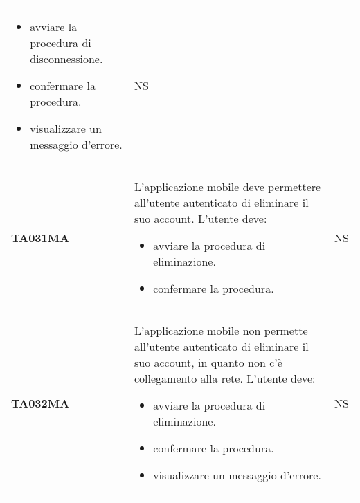 \documentclass[../../piano-di-qualifica.tex]{subfiles}
\begin{document}
\begin{longtable}[H]{>{\centering\bfseries}m{3cm} >{}m{10cm} >{\centering\arraybackslash}m{3cm}}
\begin{itemize}
    \item avviare la procedura di disconnessione.
    \item confermare la procedura.
    \item visualizzare un messaggio d'errore.
  \end{itemize}
                    & NS                                                                                                                                                                                                                                                               \\
  TA031MA           & L'applicazione mobile deve permettere all'utente autenticato di eliminare il suo account. \newline
  L'utente deve:
  \begin{itemize}
    \item avviare la procedura di eliminazione.
    \item confermare la procedura.
  \end{itemize}
                    & NS                                                                                                                                                                                                                                                               \\
  TA032MA           & L'applicazione mobile non permette all'utente autenticato di eliminare il suo account, in quanto non c'è collegamento alla rete. \newline
  L'utente deve:
  \begin{itemize}
    \item avviare la procedura di eliminazione.
    \item confermare la procedura.
    \item visualizzare un messaggio d'errore.
  \end{itemize}
                    & NS                                                                                                                                                                                                                                                               \\



\end{longtable}
\end{document}
